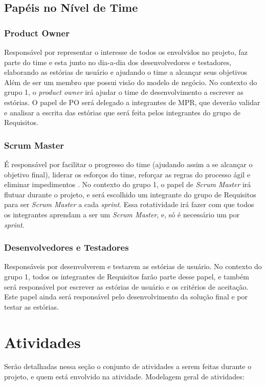 \subsection{Papéis no Nível de Time}

\subsubsection{Product Owner}
Responsável por representar o interesse de todos os envolvidos no projeto, faz parte do time e esta junto no dia-a-dia dos desenvolvedores e testadores, elaborando as estórias de usuário e ajudando o time a alcançar seus objetivos \cite[p. 47-48]{safe001} Além de ser um membro que possui visão do modelo de negócio. No contexto do grupo 1, o \emph{product owner} irá ajudar o time de desenvolvimento a escrever as estórias. O papel de PO será delegado a integrantes de MPR, que deverão validar e analisar a escrita das estórias que será feita pelos integrantes do grupo de Requisitos.

\subsubsection{Scrum Master}
É responsável por facilitar o progresso do time (ajudando assim a se alcançar o objetivo final), liderar os esforços do time, reforçar as regras do processo ágil e eliminar impedimentos \cite[p. 47-48]{safe001}. No contexto do grupo 1, o papel de \emph{Scrum Master} irá flutuar durante o projeto, e será escolhido um integrante do grupo de Requisitos para ser \emph{Scrum Master} a cada \emph{sprint}. Essa rotatividade irá fazer com que todos os integrantes aprendam a ser um \emph{Scrum Master}, e, só é necessário um por \emph{sprint}.

\subsubsection{Desenvolvedores e Testadores}
Responsáveis por desenvolverem e testarem as estórias de usuário. No contexto do grupo 1, todos os integrantes de Requisitos farão parte desse papel, e também será responsável por escrever as estórias de usuário e os critérios de aceitação. Este papel ainda será responsável pelo desenvolvimento da solução final e por testar as estórias.


\section{Atividades}
Serão detalhadas nessa seção o conjunto de atividades a serem feitas durante o projeto, e quem está envolvido na atividade.
Modelagem geral de atividades:


